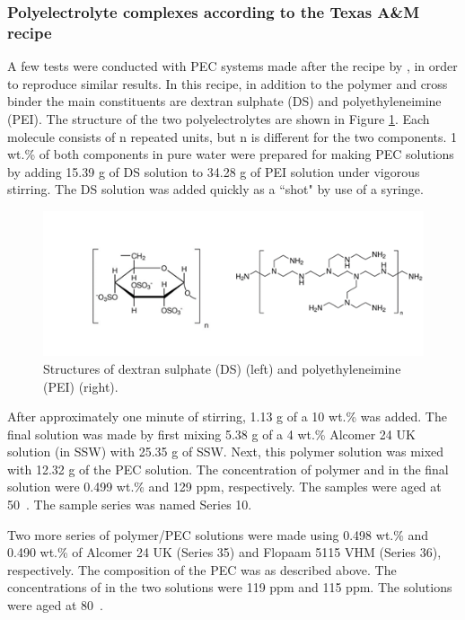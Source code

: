 \subsubsection{Polyelectrolyte complexes according to the Texas A\&M recipe}
A few tests were conducted with PEC systems made after the recipe by \cite{Johnson2010}, in order to reproduce similar results. In this recipe, in addition to the polymer and cross binder  the main constituents are dextran sulphate (DS)  and polyethyleneimine (PEI). The structure of the two polyelectrolytes are shown in Figure \ref{fig:pei}. Each molecule consists of n repeated units, but n is different for the two components. 1 wt.\% of both components in pure water were prepared for making PEC solutions by adding 15.39 g of DS solution to 34.28 g of PEI solution under vigorous stirring. The DS solution was added quickly as a ``shot" by use of a syringe.

\begin{figure}[h]
    \centering
    \includegraphics[width=\textwidth]{img/fig/pei.png}
    \caption{Structures of dextran sulphate (DS) (left) and polyethyleneimine (PEI) (right).}
    \label{fig:pei}
\end{figure}
 
After approximately one minute of stirring, 1.13 g of a 10 wt.\%  was added. The final solution was made by first mixing 5.38 g of a 4 wt.\% Alcomer 24 UK solution (in SSW) with 25.35 g of SSW. Next, this polymer solution was mixed with 12.32 g of the PEC solution. The concentration of polymer and  in the final solution were 0.499 wt.\% and 129 ppm, respectively. The samples were aged at 50~\celsius. The sample series was named Series 10.

Two more series of polymer/PEC solutions were made using 0.498 wt.\% and 0.490 wt.\% of Alcomer 24 UK (Series 35) and Flopaam 5115 VHM (Series 36), respectively. The composition of the PEC was as described above. The concentrations of  in the two solutions were 119 ppm and 115 ppm. The solutions were aged at 80~\celsius. 

